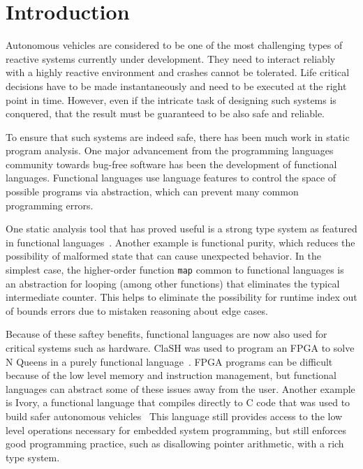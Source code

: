 \section{Introduction}

Autonomous vehicles are considered to be one of the most challenging types of reactive systems currently under development. 
They need to interact reliably with a highly reactive environment and crashes cannot be tolerated.
Life critical decisions have to be made instantaneously and need to be executed at the right point in time. 
However, even if the intricate task of designing such systems is conquered, that the result must be guaranteed to be also safe and reliable.

To ensure that such systems are indeed safe, there has been much work in static program analysis.
One major advancement from the programming languages community towards bug-free software has been the development of functional languages.
Functional languages use language features to control the space of possible programs via abstraction, which can prevent many common programming errors.

One static analysis tool that has proved useful is a strong type system as featured in functional languages~\cite{cardelli1996type}.
Another example is functional purity, which reduces the possibility of malformed state that can cause unexpected behavior.
In the simplest case, the higher-order function \texttt{map} common to functional languages is an abstraction for looping (among other functions) that eliminates the typical intermediate counter.
This helps to eliminate the possibility for runtime index out of bounds errors due to mistaken reasoning about edge cases.

Because of these saftey benefits, functional languages are now also used for critical systems such as hardware.
ClaSH was used to program an FPGA to solve N Queens in a purely functional language~\cite{clash2014}.
FPGA programs can be difficult because of the low level memory and instruction management, but functional languages can abstract some of these issues away from the user.
Another example is Ivory, a functional language that compiles directly to C code that was used to build safer autonomous vehicles~\cite{pike2014}
This language still provides access to the low level operations necessary for embedded system programming, but still enforces good programming practice, such as disallowing pointer arithmetic, with a rich type system.

